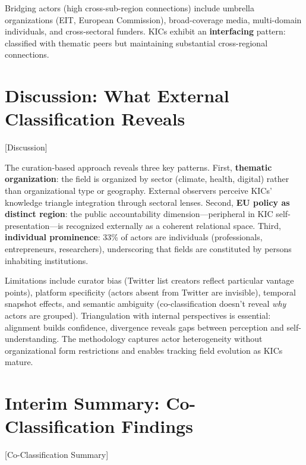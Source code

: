 \documentclass[../main.tex]{subfiles}
\begin{document}
Bridging actors (high cross-sub-region connections) include umbrella organizations (EIT, European Commission), broad-coverage media, multi-domain individuals, and cross-sectoral funders. KICs exhibit an \textbf{interfacing} pattern: classified with thematic peers but maintaining substantial cross-regional connections.


\section{Discussion: What External Classification Reveals}[Discussion]

The curation-based approach reveals three key patterns. First, \textbf{thematic organization}: the field is organized by sector (climate, health, digital) rather than organizational type or geography. External observers perceive KICs' knowledge triangle integration through sectoral lenses. Second, \textbf{EU policy as distinct region}: the public accountability dimension---peripheral in KIC self-presentation---is recognized externally as a coherent relational space. Third, \textbf{individual prominence}: 33\% of actors are individuals (professionals, entrepreneurs, researchers), underscoring that fields are constituted by persons inhabiting institutions.

Limitations include curator bias (Twitter list creators reflect particular vantage points), platform specificity (actors absent from Twitter are invisible), temporal snapshot effects, and semantic ambiguity (co-classification doesn't reveal \textit{why} actors are grouped). Triangulation with internal perspectives is essential: alignment builds confidence, divergence reveals gaps between perception and self-understanding. The methodology captures actor heterogeneity without organizational form restrictions and enables tracking field evolution as KICs mature.


\section{Interim Summary: Co-Classification Findings}[Co-Classification Summary]
\end{document}
